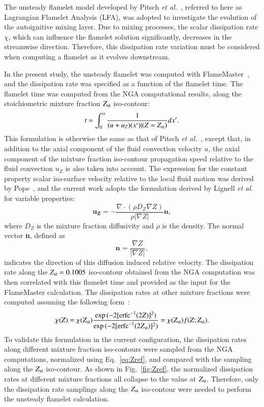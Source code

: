 \documentclass[review,3p,times]{elsarticle}
\begin{document}
The unsteady flamelet model developed by Pitsch \emph{et al.}~\cite{pitsch98a}, referred to here as Lagrangian Flamelet Analysis (LFA), was adopted to investigate the evolution of the autoignitive mixing layer.  Due to mixing processes, the scalar dissipation rate $\chi$, which can influence the flamelet solution significantly, decreases in the streamwise direction.  Therefore, this dissipation rate variation must be considered when computing a flamelet as it evolves downstream.

In the present study, the unsteady flamelet was computed with FlameMaster~\cite{flamemaster}, and the dissipation rate was specified as a function of the flamelet time.  The flamelet time was computed from the NGA computational results, along the stoichiometric mixture fraction $Z_{\rm st}$ iso-contour: 
 \begin{equation} \label{eq:t}
t = \int ^{x}_{0} \frac{1}{(u + u_Z)(x')|(Z=Z_{\rm st})} dx'.
\end{equation}
This formulation is otherwise the same as that of Pitsch \emph {et al.}~\cite{pitsch98a}, except that, in addition to the axial component of the fluid convection velocity $u$, the axial component of the mixture fraction iso-contour propagation speed relative to the fluid convection $u_Z$ is also taken into account.  The expression for the constant property scalar iso-surface velocity relative to the local fluid motion was derived by Pope~\cite{pope88}, and the current work adopts the formulation derived by Lignell \emph {et al.}~\cite{lignell07} for variable properties:
\begin{equation}
\mathbf{u_Z} = -\frac{\nabla \cdot (\rho D_Z \nabla Z) }{\rho |\nabla Z|} \mathbf{n},
\end{equation}  
where $D_Z$ is the mixture fraction diffusivity and $\rho$ is the density.  The normal vector \textbf{n}, defined as
\begin{equation}
\mathbf{n} = \frac{\nabla Z}{|\nabla Z|},
\end{equation}
indicates the direction of this diffusion induced relative velocity.
The dissipation rate along the $Z_{\rm st} = 0.1005$ iso-contour obtained from the NGA computation was then correlated with this flamelet time and provided as the input for the FlameMaster calculation.  The dissipation rates at other mixture fractions were computed assuming the following form~\cite{petersbook}:
\begin{equation} \label{eq:Zref}
\chi{(Z)} = \chi{(Z_{\rm st})} \frac{\exp{(-2[{\rm erfc}^{-1}(2Z)]^2)}}{\exp{(-2[{\rm erfc}^{-1}(2Z_{\rm st})]^2)}} = \chi{(Z_{\rm st})} f(Z;Z_{\rm st}).
\end{equation}
To validate this formulation in the current configuration, the dissipation rates along different mixture fraction iso-contours were sampled from the NGA computations, normalized using Eq.~\ref{eq:Zref}, and compared with the sampling along the $Z_{\rm st}$ iso-contour.  As shown in Fig.~\ref{fig:Zref}, the normalized dissipation rates at different mixture fractions all collapse to the value at $Z_{\rm st}$.  Therefore, only the dissipation rate samplings along the $Z_{\rm st}$ iso-contour were needed to perform the unsteady flamelet calculation.
\end{document}
